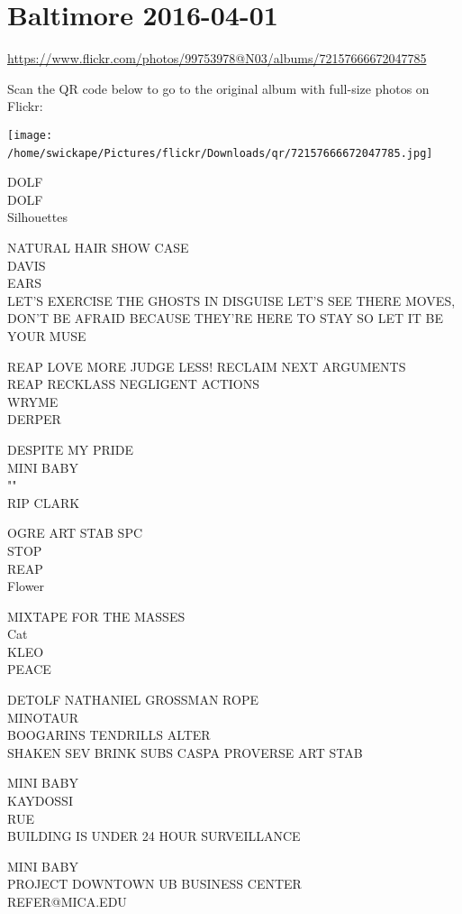 \documentclass[10pt,letterpaper]{article}
\begin{document}
\section*{Baltimore 2016-04-01}

\url{https://www.flickr.com/photos/99753978@N03/albums/72157666672047785}

Scan the QR code below to go to the original album with full-size photos on Flickr:

\texttt{[image: /home/swickape/Pictures/flickr/Downloads/qr/72157666672047785.jpg]}
\

DOLF\\
DOLF\\
Silhouettes

NATURAL HAIR SHOW CASE\\
DAVIS\\
EARS\\
LET'S EXERCISE THE GHOSTS IN DISGUISE LET'S SEE THERE MOVES, DON'T BE AFRAID BECAUSE THEY'RE HERE TO STAY SO LET IT BE YOUR MUSE

REAP LOVE MORE JUDGE LESS! RECLAIM NEXT ARGUMENTS\\
REAP RECKLASS NEGLIGENT ACTIONS\\
WRYME\\
DERPER

DESPITE MY PRIDE\\
MINI BABY\\
""\\
RIP CLARK

OGRE ART STAB SPC\\
STOP\\
REAP\\
Flower

MIXTAPE FOR THE MASSES\\
Cat\\
KLEO\\
PEACE

DETOLF NATHANIEL GROSSMAN ROPE\\
MINOTAUR\\
BOOGARINS TENDRILLS ALTER\\
SHAKEN SEV BRINK SUBS CASPA PROVERSE ART STAB

MINI BABY\\
KAYDOSSI\\
RUE\\
BUILDING IS UNDER 24 HOUR SURVEILLANCE

MINI BABY\\
PROJECT DOWNTOWN UB BUSINESS CENTER\\
REFER@MICA.EDU
\end{document}
